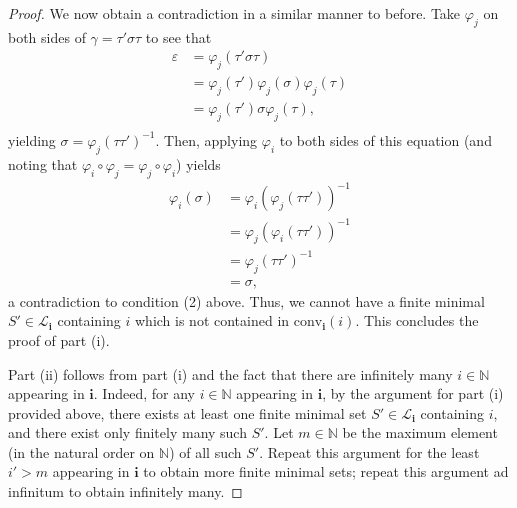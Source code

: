 \documentclass[10pt,a4paper]{amsart}
\newcommand{\NN}{\mathbb{N}}
\begin{document}
\begin{proof}
    We now obtain a contradiction in a similar manner to before. Take $\varphi_j$ on both sides of $\gamma=\tau'\sigma\tau$ to see that
    \begin{align*}
        \varepsilon&=\varphi_j(\tau'\sigma\tau)\\
        &=\varphi_j(\tau')\varphi_j(\sigma)\varphi_j(\tau)\\
        &=\varphi_j(\tau')\sigma\varphi_j(\tau),\\
    \end{align*}
    yielding $\sigma=\varphi_j(\tau\tau')^{-1}$. Then, applying $\varphi_i$ to both sides of this equation (and noting that $\varphi_i\circ\varphi_j=\varphi_j\circ\varphi_i$) yields
    \begin{align*}
        \varphi_i(\sigma)&=\varphi_i(\varphi_j(\tau\tau'))^{-1}\\
        &=\varphi_j(\varphi_i(\tau\tau'))^{-1}\\
        &=\varphi_j(\tau\tau')^{-1}\\
        &=\sigma,
    \end{align*}
    a contradiction to condition (2) above. Thus, we cannot have a finite minimal $S'\in\mathcal L_\mathbf i$ containing $i$ which is not contained in $\text{conv}_\mathbf i(i)$. This concludes the proof of part (i).

    Part (ii) follows from part (i) and the fact that there are infinitely many $i\in\NN$ appearing in $\mathbf i$. Indeed, for any $i\in\NN$ appearing in $\mathbf i$, by the argument for part (i) provided above, there exists at least one finite minimal set $S'\in\mathcal L_\mathbf i$ containing $i$, and there exist only finitely many such $S'$. Let $m\in\NN$ be the maximum element (in the natural order on $\NN$) of all such $S'$. Repeat this argument for the least $i'>m$ appearing in $\mathbf i$ to obtain more finite minimal sets; repeat this argument ad infinitum to obtain infinitely many.


\end{proof}
\end{document}
